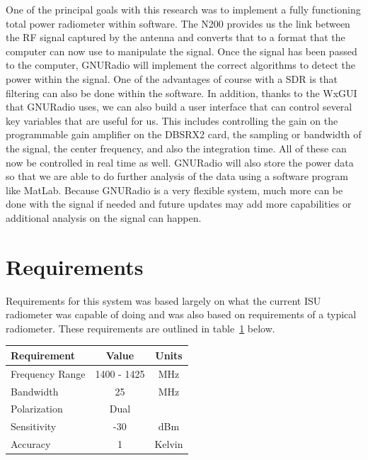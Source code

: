 One of the principal goals with this research was to implement a fully functioning total power radiometer within software.  The N200 provides us the link between the RF signal captured by the antenna and converts that to a format that the computer can now use to manipulate the signal.  Once the signal has been passed to the computer, GNURadio will implement the correct algorithms to detect the power within the signal.  One of the advantages of course with a SDR is that filtering can also be done within the software.  In addition, thanks to the WxGUI that GNURadio uses, we can also build a user interface that can control several key variables that are useful for us.  This includes controlling the gain on the programmable gain amplifier on the DBSRX2 card, the sampling or bandwidth of the signal, the center frequency, and also the integration time.  All of these can now be controlled in real time as well.  GNURadio will also store the power data so that we are able to do further analysis of the data using a software program like MatLab.  Because GNURadio is a very flexible system, much more can be done with the signal if needed and future updates may add more capabilities or additional analysis on the signal can happen.

\section{Requirements}

Requirements for this system was based largely on what the current ISU radiometer was capable of doing and was also based on requirements of a typical radiometer.  These requirements are outlined in table~\ref{requirements} below.


\begin{table}[h!tb] \centering
{}
\label{requirements}
\begin{tabular}{lcc} \hline
\textbf{Requirement} & \textbf{Value} & \textbf{Units} \\ \hline
Frequency Range & 1400 - 1425 & MHz \\
Bandwidth & 25 & MHz \\
Polarization & Dual &  \\ 
Sensitivity & -30 & dBm \\
Accuracy & 1 & Kelvin \\ \hline
\end{tabular}
\end{table}

